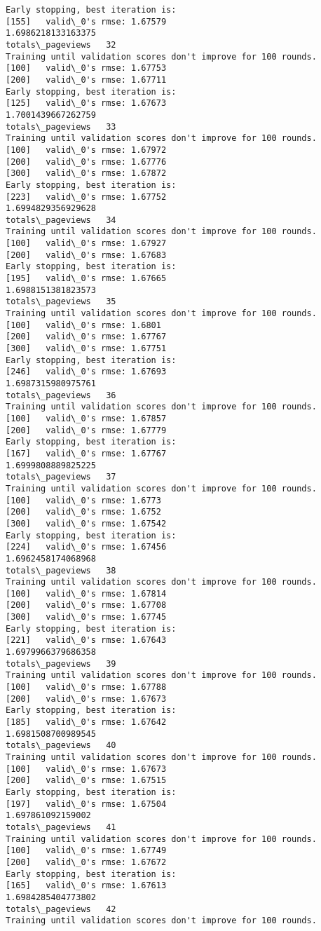 \documentclass[11pt]{article}
\begin{document}
\begin{Verbatim}[commandchars=\\\{\}]
Early stopping, best iteration is:
[155]	valid\_0's rmse: 1.67579
1.6986218133163375
totals\_pageviews   32
Training until validation scores don't improve for 100 rounds.
[100]	valid\_0's rmse: 1.67753
[200]	valid\_0's rmse: 1.67711
Early stopping, best iteration is:
[125]	valid\_0's rmse: 1.67673
1.7001439667262759
totals\_pageviews   33
Training until validation scores don't improve for 100 rounds.
[100]	valid\_0's rmse: 1.67972
[200]	valid\_0's rmse: 1.67776
[300]	valid\_0's rmse: 1.67872
Early stopping, best iteration is:
[223]	valid\_0's rmse: 1.67752
1.6994829356929628
totals\_pageviews   34
Training until validation scores don't improve for 100 rounds.
[100]	valid\_0's rmse: 1.67927
[200]	valid\_0's rmse: 1.67683
Early stopping, best iteration is:
[195]	valid\_0's rmse: 1.67665
1.6988151381823573
totals\_pageviews   35
Training until validation scores don't improve for 100 rounds.
[100]	valid\_0's rmse: 1.6801
[200]	valid\_0's rmse: 1.67767
[300]	valid\_0's rmse: 1.67751
Early stopping, best iteration is:
[246]	valid\_0's rmse: 1.67693
1.6987315980975761
totals\_pageviews   36
Training until validation scores don't improve for 100 rounds.
[100]	valid\_0's rmse: 1.67857
[200]	valid\_0's rmse: 1.67779
Early stopping, best iteration is:
[167]	valid\_0's rmse: 1.67767
1.6999808889825225
totals\_pageviews   37
Training until validation scores don't improve for 100 rounds.
[100]	valid\_0's rmse: 1.6773
[200]	valid\_0's rmse: 1.6752
[300]	valid\_0's rmse: 1.67542
Early stopping, best iteration is:
[224]	valid\_0's rmse: 1.67456
1.6962458174068968
totals\_pageviews   38
Training until validation scores don't improve for 100 rounds.
[100]	valid\_0's rmse: 1.67814
[200]	valid\_0's rmse: 1.67708
[300]	valid\_0's rmse: 1.67745
Early stopping, best iteration is:
[221]	valid\_0's rmse: 1.67643
1.6979966379686358
totals\_pageviews   39
Training until validation scores don't improve for 100 rounds.
[100]	valid\_0's rmse: 1.67788
[200]	valid\_0's rmse: 1.67673
Early stopping, best iteration is:
[185]	valid\_0's rmse: 1.67642
1.6981508700989545
totals\_pageviews   40
Training until validation scores don't improve for 100 rounds.
[100]	valid\_0's rmse: 1.67673
[200]	valid\_0's rmse: 1.67515
Early stopping, best iteration is:
[197]	valid\_0's rmse: 1.67504
1.697861092159002
totals\_pageviews   41
Training until validation scores don't improve for 100 rounds.
[100]	valid\_0's rmse: 1.67749
[200]	valid\_0's rmse: 1.67672
Early stopping, best iteration is:
[165]	valid\_0's rmse: 1.67613
1.6984285404773802
totals\_pageviews   42
Training until validation scores don't improve for 100 rounds.

\end{Verbatim}
\end{document}
